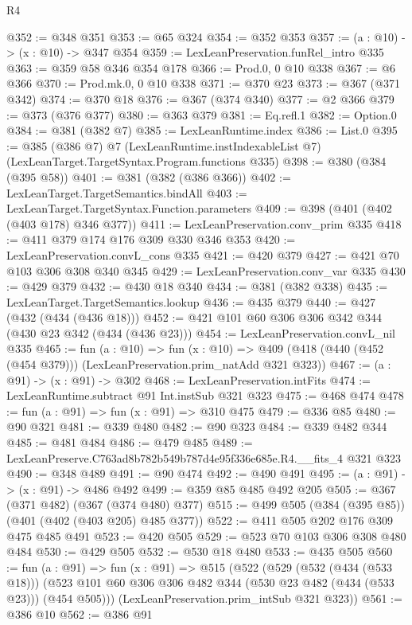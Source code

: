 \begin{lexlean}{R4}
\begin{coremodule}
@352 := @348 @351
@353 := @65 @324
@354 := @352 @353
@357 := (a : @10) -> (x : @10) -> @347 @354
@359 := LexLeanPreservation.funRel_intro @335
@363 := @359 @58 @346 @354 @178
@366 := Prod.{0, 0} @10 @338
@367 := @6 @366
@370 := Prod.mk.{0, 0} @10 @338
@371 := @370 @23
@373 := @367 (@371 @342)
@374 := @370 @18
@376 := @367 (@374 @340)
@377 := @2 @366
@379 := @373 (@376 @377)
@380 := @363 @379
@381 := Eq.refl.{1}
@382 := Option.{0}
@384 := @381 (@382 @7)
@385 := LexLeanRuntime.index
@386 := List.{0}
@395 := @385
    (@386 @7)
    @7
    (LexLeanRuntime.instIndexableList @7)
    (LexLeanTarget.TargetSyntax.Program.functions @335)
@398 := @380 (@384 (@395 @58))
@401 := @381 (@382 (@386 @366))
@402 := LexLeanTarget.TargetSemantics.bindAll
@403 := LexLeanTarget.TargetSyntax.Function.parameters
@409 := @398 (@401 (@402 (@403 @178) @346 @377))
@411 := LexLeanPreservation.conv_prim @335
@418 := @411 @379 @174 @176 @309 @330 @346 @353
@420 := LexLeanPreservation.convL_cons @335
@421 := @420 @379
@427 := @421 @70 @103 @306 @308 @340 @345
@429 := LexLeanPreservation.conv_var @335
@430 := @429 @379
@432 := @430 @18 @340
@434 := @381 (@382 @338)
@435 := LexLeanTarget.TargetSemantics.lookup
@436 := @435 @379
@440 := @427 (@432 (@434 (@436 @18)))
@452 := @421 @101 @60 @306 @306 @342 @344 (@430 @23 @342 (@434 (@436 @23)))
@454 := LexLeanPreservation.convL_nil @335
@465 := fun (a : @10) =>
  fun (x : @10) => @409 (@418 (@440 (@452 (@454 @379))) (LexLeanPreservation.prim_natAdd @321 @323))
@467 := (a : @91) -> (x : @91) -> @302
@468 := LexLeanPreservation.intFits
@474 := LexLeanRuntime.subtract @91 Int.instSub @321 @323
@475 := @468 @474
@478 := fun (a : @91) => fun (x : @91) => @310 @475
@479 := @336 @85
@480 := @90 @321
@481 := @339 @480
@482 := @90 @323
@484 := @339 @482 @344
@485 := @481 @484
@486 := @479 @485
@489 := LexLeanPreserve.C763ad8b782b549b787d4e95f336e685e.R4.__fits_4 @321 @323
@490 := @348 @489
@491 := @90 @474
@492 := @490 @491
@495 := (a : @91) -> (x : @91) -> @486 @492
@499 := @359 @85 @485 @492 @205
@505 := @367 (@371 @482) (@367 (@374 @480) @377)
@515 := @499 @505 (@384 (@395 @85)) (@401 (@402 (@403 @205) @485 @377))
@522 := @411 @505 @202 @176 @309 @475 @485 @491
@523 := @420 @505
@529 := @523 @70 @103 @306 @308 @480 @484
@530 := @429 @505
@532 := @530 @18 @480
@533 := @435 @505
@560 := fun (a : @91) =>
  fun (x : @91) =>
  @515
    (@522
      (@529
        (@532 (@434 (@533 @18)))
        (@523 @101 @60 @306 @306 @482 @344 (@530 @23 @482 (@434 (@533 @23))) (@454 @505)))
      (LexLeanPreservation.prim_intSub @321 @323))
@561 := @386 @10
@562 := @386 @91

\end{coremodule}
\end{lexlean}
